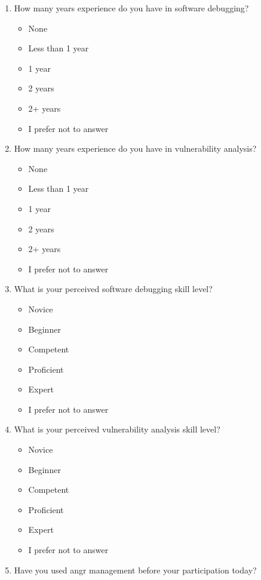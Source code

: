 \begin{enumerate}
    \item How many years experience do you have in software debugging?
    \begin{itemize}
        \item None
        \item Less than 1 year
        \item 1 year
        \item 2 years
        \item 2+ years
        \item I prefer not to answer
    \end{itemize}
    \item How many years experience do you have in vulnerability analysis?
    \begin{itemize}
        \item None
        \item Less than 1 year
        \item 1 year
        \item 2 years
        \item 2+ years
        \item I prefer not to answer
    \end{itemize}
    \item What is your perceived software debugging skill level?
    \begin{itemize}
        \item Novice
        \item Beginner
        \item Competent
        \item Proficient
        \item Expert
        \item I prefer not to answer
    \end{itemize}
    \item What is your perceived vulnerability analysis skill level?
    \begin{itemize}
        \item Novice
        \item Beginner
        \item Competent
        \item Proficient
        \item Expert
        \item I prefer not to answer
    \end{itemize}
    \item Have you used angr management before your participation today?

\end{enumerate}
